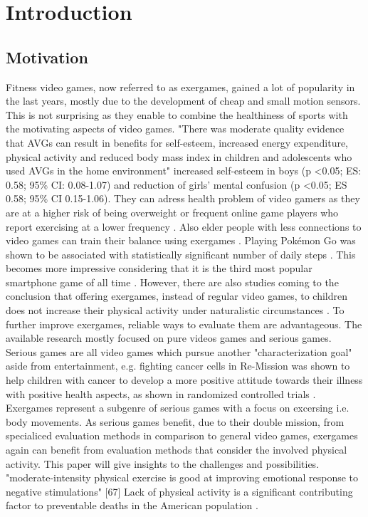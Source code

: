 \chapter{Introduction}
\label{ch:introduction}


\section{Motivation}
Fitness video games, now referred to as exergames, gained a lot of popularity in the last years, mostly due to the development of cheap and small motion sensors. This is not surprising as they enable to combine the healthiness of sports with the motivating aspects of video games.
"There was moderate quality evidence that AVGs can result in benefits for self-esteem, increased energy
expenditure, physical activity and reduced body mass index in children and adolescents who used
AVGs in the home environment" \cite{santos2020active}
increased self-esteem in boys (p <0.05; ES: 0.58; 95\% CI: 0.08-1.07) and reduction of girls’ mental confusion (p <0.05; ES 0.58; 95\% CI 0.15-1.06).\cite{andrade2020effect}
They can adress health problem of video gamers as they are at a higher risk of being overweight \cite{melchior2014internet} or frequent online game players who report exercising at a lower frequency \cite{kowert2014unpopular}. Also elder people with less connections to video games can train their balance using exergames \cite{lai2013effects}. Playing Pokémon Go was shown to be associated with statistically significant number of daily steps \cite{khamzina2019impact}. This becomes more impressive considering that it is the third most popular smartphone game of all time \cite{link_pokemongo}. However, there are also studies coming to the conclusion that offering exergames, instead of regular video games, to children does not increase their physical activity under naturalistic circumstances \cite{baranowski2012impact}. 
To further improve exergames, reliable ways to evaluate them are advantageous. The available research mostly focused on pure videos games and serious games. Serious games are all video games which pursue another "characterization goal" aside from entertainment, e.g. fighting cancer cells in Re-Mission \cite{link_remission} was shown to help children with cancer to develop a more positive attitude towards their illness with positive health aspects, as shown in randomized controlled trials \cite{kato2008video}.
Exergames represent a subgenre of serious games with a focus on excersing i.e. body movements. As serious games benefit, due to their double mission, from specialiced evaluation methods \cite{caserman2020quality} in comparison to general video games, exergames again can benefit from evaluation methods that consider the involved physical activity. This paper will give insights to the challenges and possibilities.
"moderate-intensity physical exercise is good at improving emotional response to negative stimulations" [67]
Lack of physical activity is a significant contributing factor to preventable deaths in the American population \cite{bauer2014prevention}.

